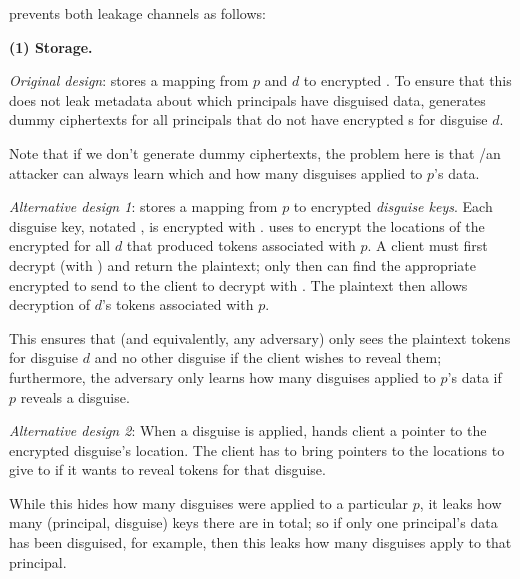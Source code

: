 \noindent
\sys prevents both leakage channels as follows:

\vspace{6pt}\noindent\textbf{(1) \symk{} Storage.}

\emph{Original design}: \sys stores a mapping from $p$ and $d$ to encrypted .
To ensure that this does not leak metadata about which principals have disguised data, \sys generates dummy ciphertexts for all
principals that do not have encrypted s for disguise $d$.

Note that if we don't generate dummy ciphertexts, the problem here is that \sys/an attacker can always
learn which and how many disguises applied to $p$'s data.

\vspace{12pt}
\emph{Alternative design 1}:
\sys stores a mapping from $p$ to encrypted \emph{disguise keys}. 
%
Each disguise key, notated , is encrypted with . 
\sys uses  to encrypt the locations of the encrypted  for all $d$ that produced
tokens associated with $p$.
A client must first decrypt (with ) and return the  plaintext; only then can \sys find the appropriate
encrypted  to send to the client to decrypt with . The plaintext  then allows decryption of
$d$'s tokens associated with $p$.

This ensures that \sys (and equivalently, any adversary) only sees the plaintext tokens for disguise
$d$ and no other disguise if the client wishes to reveal them; 
furthermore, the adversary only learns how many disguises applied to $p$'s data if $p$ reveals a
disguise.


\vspace{12pt}
\emph{Alternative design 2}: When a disguise is applied, \sys hands client a pointer to the
encrypted disguise's  location. The client has to bring pointers to the locations to give
to \sys if it wants to reveal tokens for that disguise.  

While this hides how many disguises were
applied to a particular $p$, it leaks how many (principal, disguise) keys there are in total; so if
only one principal's data has been disguised, for example, then this leaks how many disguises apply
to that principal.

